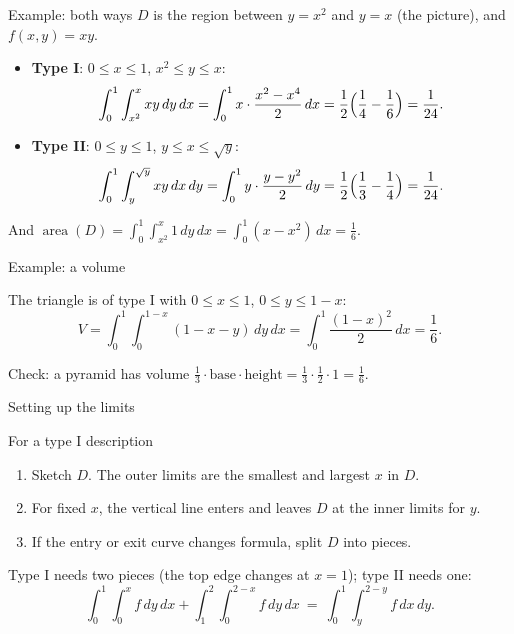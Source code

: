 \documentclass[10pt]{wosm-slides}
\begin{document}
\begin{frame}{Example: both ways}
  $D$ is the region between $y = x^2$ and $y = x$ (the picture), and $f(x, y) = xy$.
  \pause
  \begin{itemize}
    \item \textbf{Type I}: $0 \le x \le 1$, $x^2 \le y \le x$:
      \[ \int_0^1 \int_{x^2}^{x} xy\, dy\, dx = \int_0^1 x \cdot \frac{x^2 - x^4}{2}\, dx
         = \frac12 \Bigl(\frac14 - \frac16\Bigr) = \frac{1}{24} . \]
    \pause
    \item \textbf{Type II}: $0 \le y \le 1$, $y \le x \le \sqrt y$:
      \[ \int_0^1 \int_{y}^{\sqrt y} xy\, dx\, dy = \int_0^1 y \cdot \frac{y - y^2}{2}\, dy
         = \frac12 \Bigl(\frac13 - \frac14\Bigr) = \frac{1}{24} . \]
  \end{itemize}
  \pause
  {\small And $\operatorname{area}(D) = \int_0^1 \int_{x^2}^x 1\, dy\, dx = \int_0^1 (x - x^2)\, dx = \frac16$.\par}
\end{frame}

\begin{frame}{Example: a volume}
  \begin{example}[The tetrahedron under $z = 1 - x - y$, above the triangle $x, y \ge 0$, $x + y \le 1$]
    The triangle is of type I with $0 \le x \le 1$, $0 \le y \le 1 - x$:
    \[ V = \int_0^1 \int_0^{1-x} (1 - x - y)\, dy\, dx
         = \int_0^1 \frac{(1 - x)^2}{2}\, dx = \frac16 . \]
  \end{example}
  \pause
  {\small Check: a pyramid has volume $\frac13 \cdot \text{base} \cdot \text{height} = \frac13 \cdot \frac12 \cdot 1 = \frac16$.\par}
\end{frame}

\begin{frame}{Setting up the limits}
  \begin{block}{For a type I description}
    \begin{enumerate}
      \item Sketch $D$. The outer limits are the smallest and largest $x$ in $D$.
      \item For fixed $x$, the vertical line enters and leaves $D$ at the inner limits for $y$.
      \item If the entry or exit curve changes formula, split $D$ into pieces.
    \end{enumerate}
  \end{block}
  \pause
  \begin{example}
    Type I needs two pieces (the top edge changes at $x = 1$); type II needs one:
    \[ \int_0^1 \!\! \int_0^x f\, dy\, dx + \int_1^2 \!\! \int_0^{2-x} f\, dy\, dx
       \ = \ \int_0^1 \!\! \int_y^{2-y} f\, dx\, dy . \]
  \end{example}
\end{frame}
\end{document}
